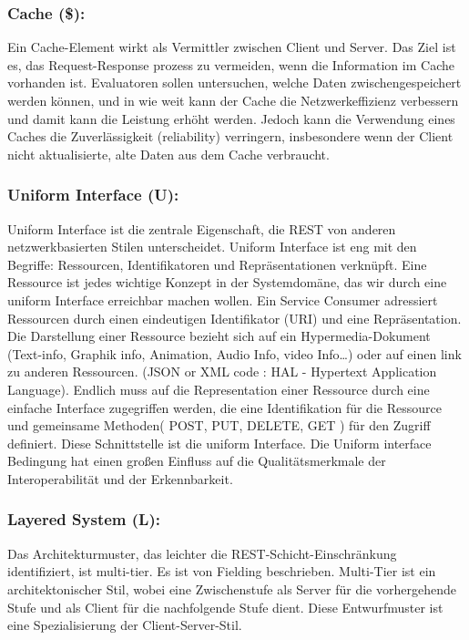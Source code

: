 \documentclass{acmsiggraph}
\begin{document}
\subsubsection{Cache (\$):}
Ein Cache-Element wirkt als Vermittler zwischen Client und Server. Das Ziel ist es, das Request-Response prozess  zu vermeiden, wenn die Information im Cache vorhanden ist.
Evaluatoren sollen untersuchen, welche Daten zwischengespeichert werden können, und in wie weit kann der Cache die Netzwerkeffizienz verbessern und damit kann die Leistung erhöht werden.
Jedoch kann die Verwendung eines Caches die Zuverlässigkeit (reliability) verringern, insbesondere wenn der Client nicht aktualisierte, alte Daten aus dem Cache verbraucht.

\subsubsection{Uniform Interface (U):}
Uniform Interface ist die zentrale Eigenschaft, die REST von anderen netzwerkbasierten Stilen unterscheidet.
Uniform Interface ist eng mit den Begriffe: Ressourcen, Identifikatoren und Repräsentationen verknüpft.
Eine Ressource ist jedes wichtige Konzept in der Systemdomäne, das wir durch eine uniform Interface erreichbar machen wollen.
Ein Service Consumer adressiert Ressourcen durch einen eindeutigen Identifikator (URI) und eine Repräsentation. Die Darstellung einer Ressource bezieht sich auf ein Hypermedia-Dokument (Text-info, Graphik info,  Animation, Audio Info, video Info…) oder auf einen link zu anderen Ressourcen. (JSON or XML code : HAL - Hypertext Application Language). 
Endlich muss auf die Representation einer Ressource durch eine einfache Interface zugegriffen werden, die eine Identifikation für die Ressource und gemeinsame Methoden( POST, PUT, DELETE, GET ) für den Zugriff definiert. Diese Schnittstelle ist die uniform Interface. Die Uniform interface Bedingung hat einen großen Einfluss auf die Qualitätsmerkmale der Interoperabilität und der Erkennbarkeit. 

\subsubsection{Layered System (L):}
Das Architekturmuster, das leichter die REST-Schicht-Einschränkung identifiziert, ist multi-tier. Es ist von Fielding beschrieben.
Multi-Tier ist ein architektonischer Stil, wobei eine Zwischenstufe als Server für die vorhergehende Stufe und als Client für die nachfolgende Stufe dient.
Diese  Entwurfmuster ist eine Spezialisierung der Client-Server-Stil. 
\end{document}
